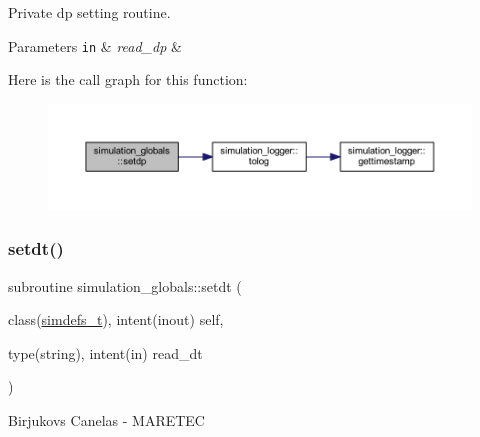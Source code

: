 Private dp setting routine. 
\begin{DoxyParams}[1]{Parameters}
\mbox{\tt in}  & {\em read\+\_\+dp} & \\
\hline
\end{DoxyParams}
Here is the call graph for this function\+:\nopagebreak
\begin{figure}[H]
\begin{center}
\leavevmode
\includegraphics[width=350pt]{namespacesimulation__globals_a9a8e88c06937b7cf6be9d9bf30f54ba9_cgraph}
\end{center}
\end{figure}
\mbox{\label{namespacesimulation__globals_a3ef0462db5a60ac79304cabd2fdd914d}} 
\subsubsection{\texorpdfstring{setdt()}{setdt()}}
{\footnotesize\ttfamily subroutine simulation\+\_\+globals\+::setdt (\begin{DoxyParamCaption}\item[{class(\hyperlink{structsimulation__globals_1_1simdefs__t}{simdefs\+\_\+t}), intent(inout)}]{self,  }\item[{type(string), intent(in)}]{read\+\_\+dt }\end{DoxyParamCaption})\hspace{0.3cm}{\ttfamily [private]}}



Birjukovs Canelas -\/ M\+A\+R\+E\+T\+EC 

